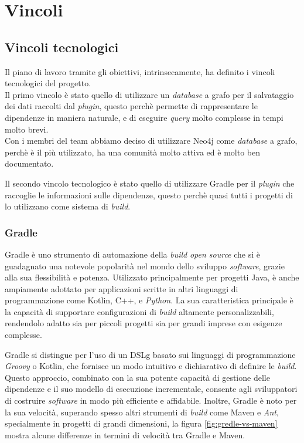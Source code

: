 \section{Vincoli}
  \subsection*{ Vincoli tecnologici}

  Il piano di lavoro tramite gli obiettivi, intrinsecamente, ha definito i vincoli tecnologici del progetto.\\
  Il primo vincolo è stato quello di utilizzare un \textit{database} a grafo per il salvataggio dei dati raccolti dal \textit{plugin},
  questo perchè permette di rappresentare le dipendenze in maniera naturale, e di eseguire \textit{query} molto complesse in tempi molto brevi.\\
  Con i membri del team abbiamo deciso di utilizzare Neo4j come \textit{database} a grafo, perchè è il più utilizzato, ha una comunità molto attiva
ed è molto ben documentato.

Il secondo vincolo tecnologico è stato quello di utilizzare Gradle per il \textit{plugin} che raccoglie le informazioni sulle dipendenze,
questo perchè quasi tutti i progetti di {\azienda} lo utilizzano come sistema di \textit{build}.\\

\subsubsection*{Gradle}
  Gradle è uno strumento di automazione della \textit{build} \textit{open source} che si è guadagnato una notevole popolarità nel mondo 
dello sviluppo \textit{software}, grazie alla sua flessibilità e potenza. Utilizzato principalmente per progetti Java, 
è anche ampiamente adottato per applicazioni scritte in altri linguaggi di programmazione come Kotlin, C++, e \textit{Python}. 
La sua caratteristica principale è la capacità di supportare configurazioni di \textit{build} altamente personalizzabili, 
rendendolo adatto sia per piccoli progetti sia per grandi imprese con esigenze complesse.

Gradle si distingue per l'uso di un \gls{DSLg} basato sui linguaggi di programmazione \textit{Groovy} o Kotlin,
 che fornisce un modo intuitivo e dichiarativo di definire le \textit{build}. Questo approccio, combinato con la sua potente capacità di 
 gestione delle dipendenze e il suo modello di esecuzione incrementale, consente agli sviluppatori di costruire \textit{software} in modo più 
 efficiente e affidabile. Inoltre, Gradle è noto per la sua velocità, superando spesso altri strumenti di \textit{build} come Maven 
 e \textit{Ant}, specialmente in progetti di grandi dimensioni, la figura \ref*{fig:gredle-vs-maven} mostra alcune differenze in termini di velocità 
 tra Gradle e Maven.

